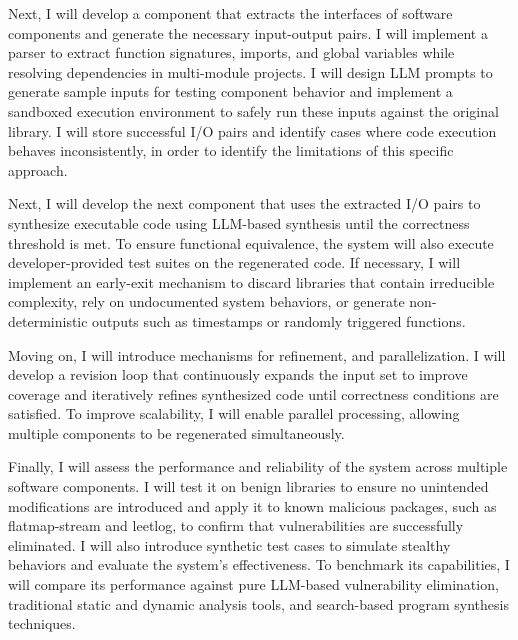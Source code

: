 \documentclass[a4paper,twoside,11pt]{report} %
\begin{document}
Next, I will develop a component that extracts
the interfaces of software components and generate the necessary input-output
pairs.
I will implement a parser to extract function signatures, imports, and
global variables while resolving dependencies in multi-module projects.
I will
design LLM prompts to generate sample inputs for testing component behavior and
implement a sandboxed execution environment to safely run these inputs against
the original library. I will store successful I/O pairs and identify cases
where code execution behaves inconsistently, in order to identify the limitations of this specific approach.

Next, I will develop the next component that uses the extracted I/O pairs to
synthesize
executable code using LLM-based synthesis until the correctness threshold is
met.
To ensure functional equivalence, the system will also execute developer-provided test
suites on the regenerated code. If necessary, I will
implement an early-exit mechanism to discard libraries that contain irreducible
complexity, rely on undocumented system behaviors, or generate
non-deterministic outputs such as timestamps or randomly triggered functions.

Moving on, I will
introduce mechanisms for refinement, and parallelization.
I will develop a revision loop that continuously expands the input set to
improve coverage and iteratively refines synthesized code until correctness
conditions are satisfied.
To improve scalability, I will enable parallel processing,
allowing multiple components to be regenerated simultaneously.

Finally, I will assess the performance
and reliability of the system across multiple software components.
I will test
it on benign libraries to ensure no unintended modifications are introduced and
apply it to known malicious packages, such as flatmap-stream and leetlog, to
confirm that vulnerabilities are successfully eliminated.
I will also introduce
synthetic test cases to simulate stealthy behaviors and evaluate the system’s
effectiveness.
To benchmark its capabilities, I will compare its performance
against pure LLM-based vulnerability elimination, traditional static and
dynamic analysis tools, and search-based program synthesis techniques.
\end{document}
